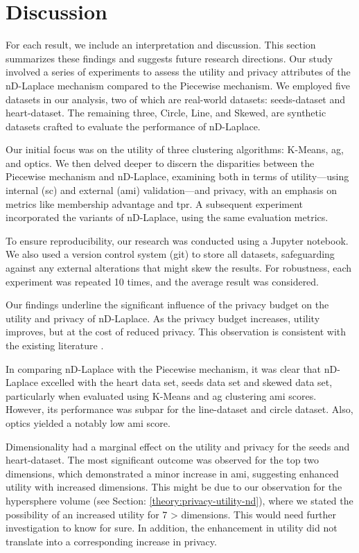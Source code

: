 \chapter{Discussion}
For each result, we include an interpretation and discussion. This section summarizes these findings and suggests future research directions.
Our study involved a series of experiments to assess the utility and privacy attributes of the nD-Laplace mechanism compared to the Piecewise mechanism. We employed five datasets in our analysis, two of which are real-world datasets: seeds-dataset and heart-dataset. The remaining three, Circle, Line, and Skewed, are synthetic datasets crafted to evaluate the performance of nD-Laplace.

Our initial focus was on the utility of three clustering algorithms: K-Means, \gls{ag}, and \gls{optics}. We then delved deeper to discern the disparities between the Piecewise mechanism and nD-Laplace, examining both in terms of utility—using internal (\gls{sc}) and external (\gls{ami}) validation—and privacy, with an emphasis on metrics like membership advantage and \gls{tpr}. A subsequent experiment incorporated the variants of nD-Laplace, using the same evaluation metrics.

To ensure reproducibility, our research was conducted using a Jupyter notebook. We also used a version control system (git) to store all datasets, safeguarding against any external alterations that might skew the results. For robustness, each experiment was repeated 10 times, and the average result was considered. 

Our findings underline the significant influence of the privacy budget on the utility and privacy of nD-Laplace. As the privacy budget increases, utility improves, but at the cost of reduced privacy. This observation is consistent with the existing literature \citep{sun_distributed_2019, xia_distributed_2020, 9679364}. \newline

In comparing nD-Laplace with the Piecewise mechanism, it was clear that nD-Laplace excelled with the heart data set, seeds data set and skewed data set, particularly when evaluated using K-Means and \gls{ag} clustering \gls{ami} scores. However, its performance was subpar for the line-dataset and circle dataset. Also, \gls{optics} yielded a notably low \gls{ami} score.

Dimensionality had a marginal effect on the utility and privacy for the seeds and heart-dataset. The most significant outcome was observed for the top two dimensions, which demonstrated a minor increase in \gls{ami}, suggesting enhanced utility with increased dimensions.  This might be due to our observation for the hypersphere volume (see Section: \ref{theory:privacy-utility-nd}), where we stated the possibility of an increased utility for 7 > dimensions. This would need further investigation to know for sure.
In addition, the enhancement in utility did not translate into a corresponding increase in privacy. 

